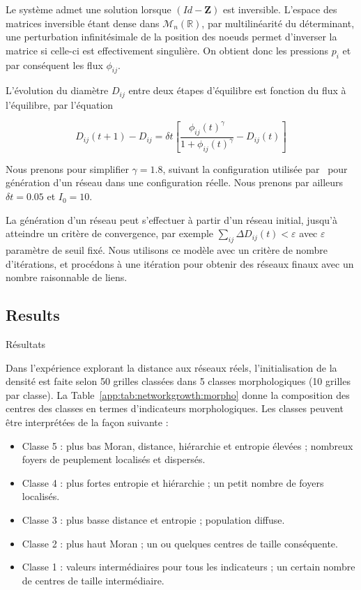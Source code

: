 Le système admet une solution lorsque $\left(Id - \mathbf{Z}\right)$ est inversible. L'espace des matrices inversible étant dense dans $\mathcal{M}_n(\mathbb{R})$, par multilinéarité du déterminant, une perturbation infinitésimale de la position des noeuds permet d'inverser la matrice si celle-ci est effectivement singulière. On obtient donc les pressions $p_i$ et par conséquent les flux $\phi_{ij}$.


L'évolution du diamètre $D_{ij}$ entre deux étapes d'équilibre est fonction du flux à l'équilibre, par l'équation 

\[
D_{ij} (t+1) - D_{ij} = \delta t \left[ \frac{\phi_{ij}(t)^\gamma}{1 + \phi_{ij}(t)^\gamma} - D_{ij}(t)\right]
\]

Nous prenons pour simplifier  $\gamma = 1.8$, suivant la configuration utilisée par~\cite{tero2010rules} pour génération d'un réseau dans une configuration réelle. Nous prenons par ailleurs $\delta t = 0.05$ et $I_0 = 10$.

La génération d'un réseau peut s'effectuer à partir d'un réseau initial, jusqu'à atteindre un critère de convergence, par exemple $\sum_{ij} \Delta D_{ij} (t) < \varepsilon$ avec $\varepsilon$ paramètre de seuil fixé. Nous utilisons ce modèle avec un critère de nombre d'itérations, et procédons à une itération pour obtenir des réseaux finaux avec un nombre raisonnable de liens.




\subsection{Results}{Résultats}


Dans l'expérience explorant la distance aux réseaux réels, l'initialisation de la densité est faite selon 50 grilles classées dans 5 classes morphologiques (10 grilles par classe). La Table~\ref{app:tab:networkgrowth:morpho} donne la composition des centres des classes en termes d'indicateurs morphologiques. Les classes peuvent être interprétées de la façon suivante :
\begin{itemize}
	\item Classe 5 : plus bas Moran, distance, hiérarchie et entropie élevées ; nombreux foyers de peuplement localisés et dispersés.
	\item Classe 4 : plus fortes entropie et hiérarchie ; un petit nombre de foyers localisés.
	\item Classe 3 : plus basse distance et entropie ; population diffuse.
	\item Classe 2 : plus haut Moran ; un ou quelques centres de taille conséquente.
	\item Classe 1 : valeurs intermédiaires pour tous les indicateurs ; un certain nombre de centres de taille intermédiaire.
\end{itemize}


